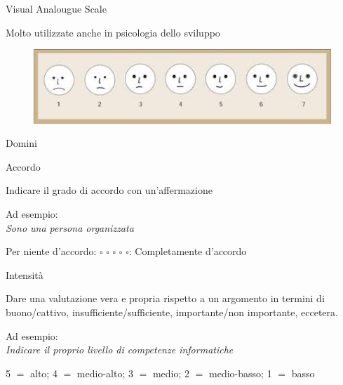 \documentclass[compress]{beamer}
\begin{document}
\begin{frame}{Visual Analougue Scale}

Molto utilizzate anche in psicologia dello sviluppo 

	\begin{figure}
		\centering
		\includegraphics[width=0.7\linewidth]{vas}
	\end{figure}

\end{frame}

\begin{frame}{Domini}
	
	\begin{block}{Accordo}
		
		Indicare il grado di accordo con un'affermazione
		
		Ad esempio:\\
	\emph{Sono una persona organizzata} 
	\begin{center}
		Per niente d'accordo:	$\square$ \hspace{1.5mm} $\square$ \hspace{1.5mm} $\square$ \hspace{1.5mm} $\square$ \hspace{1.5mm} $\square$: Completamente d'accordo
	\end{center}
	\end{block}
	
		\begin{block}{Intensità}
		
	Dare una valutazione vera e propria rispetto a un argomento in termini di buono/cattivo, insufficiente/sufficiente, importante/non importante, eccetera. 
	
	Ad esempio: \\
	\emph{Indicare il proprio livello di competenze informatiche}
	\begin{center}
		5 $=$ alto; \hspace{1.5mm} 4 $=$ medio-alto; \hspace{1.5mm} 3 $=$ medio; \hspace{1.5mm} 2 $=$ medio-basso; \hspace{1.5mm} 1 $=$ basso
	\end{center}
	\end{block}
	

\end{frame}
\end{document}
